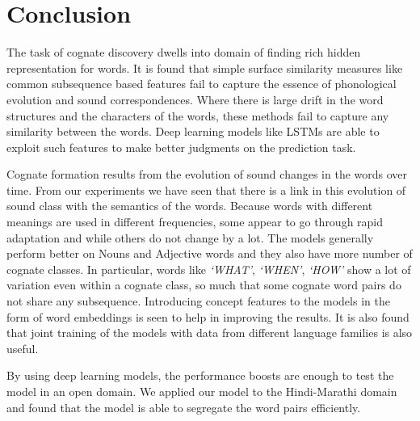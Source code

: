 \documentclass[11pt,letterpaper]{article}
\begin{document}
\section{Conclusion}

The task of cognate discovery dwells into domain of finding rich hidden representation for words. It is found that simple surface similarity measures like common subsequence based features fail to capture the essence of phonological evolution and sound correspondences. Where there is large drift in the word structures and the characters of the words, these methods fail to capture any similarity between the words. Deep learning models like LSTMs are able to exploit such features to make better judgments on the prediction task. 

Cognate formation results from the evolution of sound changes in the words over time. From our experiments we have seen that there is a link in this evolution of sound class with the semantics of the words. Because words with different meanings are used in different frequencies, some appear to go through rapid adaptation and while others do not change by a lot. The models generally perform better on Nouns and Adjective words and they also have more number of cognate classes. In particular, words like \textit{`WHAT'}, \textit{`WHEN'}, \textit{`HOW'} show a lot of variation even within a cognate class, so much that some cognate word pairs do not share any subsequence. Introducing concept features to the models in the form of word embeddings is seen to help in improving the results. It is also found that joint training of the models with data from different language families is also useful.

By using deep learning models, the performance boosts are enough to test the model in an open domain. We applied our model to the Hindi-Marathi domain and found that the model is able to segregate the word pairs efficiently. 



\end{document}
